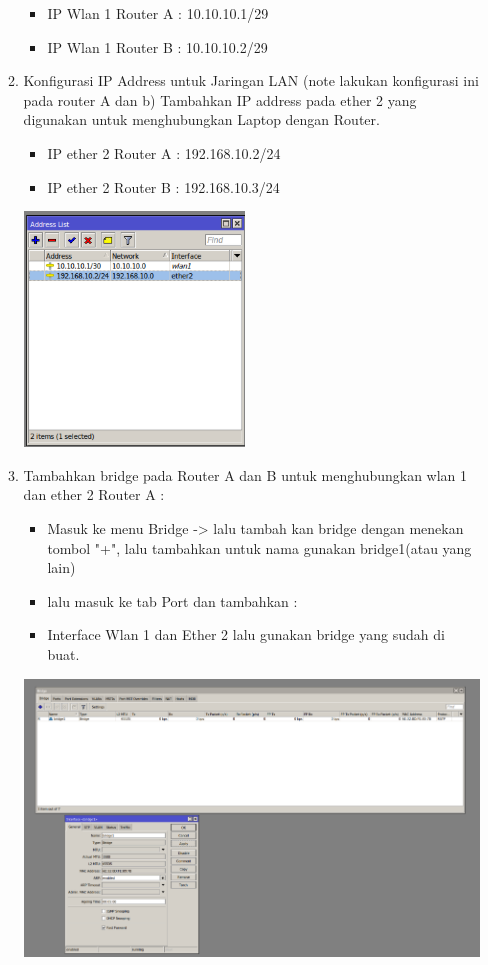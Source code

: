 \begin{enumerate}
\begin{enumerate}
\begin{itemize}
            \item IP Wlan 1 Router A : 10.10.10.1/29
            \item IP Wlan 1 Router B : 10.10.10.2/29
        \end{itemize}
        \item Konfigurasi IP Address untuk Jaringan LAN (note lakukan konfigurasi ini pada router A dan b) Tambahkan IP address pada ether 2 yang digunakan untuk menghubungkan Laptop dengan Router.
        \begin{itemize}
            \item IP ether 2 Router A : 192.168.10.2/24
            \item IP ether 2 Router B : 192.168.10.3/24
        \end{itemize}
        \includegraphics[scale=2]{P1/img/11.png} \newline
        \item Tambahkan bridge pada Router A dan B untuk menghubungkan wlan 1 dan ether 2 Router A :
        \begin{itemize}
            \item Masuk ke menu Bridge -> lalu tambah kan bridge dengan menekan tombol "+", lalu tambahkan untuk nama gunakan bridge1(atau yang lain)
            \item lalu masuk ke tab Port dan tambahkan :
            \item Interface Wlan 1 dan Ether 2 lalu gunakan bridge yang sudah di buat.
        \end{itemize}
        \includegraphics[scale=0.6]{P1/img/10.png} \newline

\end{enumerate}
\end{enumerate}
